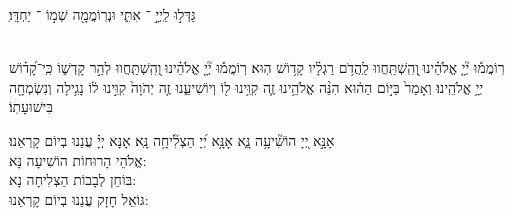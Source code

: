\documentclass[twoside, openany, parskip=half, 11pt]{book}
\begin{document}
ֽגַּדְּל֣וּ 
לַֽיְיָ֣ ־ אִתִּ֑י וּנְרֽוֹמֲמָ֖ה שְׁמ֣וֹ ־ יַחְדָּֽו׃

\\
רֽוֹמֲמ֡וּ
 יְ֘יָ֤ אֱלֹהֵ֗ינוּ ֖וְהִֽשְׁתַּֽחֲווּ לַֽהֲדֹ֥ם רַגְלָ֗יו קָד֥וֹשׁ הֽוּא׃ 
רֽוֹמֲמ֡וּ יְ֘יָ֤ אֱלֹהֵ֗ינוּ ֖וְהִֽשְׁתַּֽחֲווּ לְהַ֣ר קָדְשׁ֑וֹ כִּֽי־קָ֝ד֗וֹשׁ יְיָ֥ אֱלֹהֵֽינוּ׃
וְאָמַר֙
 בַּיּ֣וֹם הַה֔וּא הִנֵּ֨ה אֱלֹהֵ֥ינוּ זֶ֛ה קִוִּ֥ינוּ ל֖וֹ וְיוֹשִׁיעֵ֑נוּ זֶ֤ה יְהֹוָה֙ קִוִּ֣ינוּ ל֔וֹ נָגִ֥ילָה וְנִשְׂמְחָ֖ה בִּישׁוּעָתֽוֹ׃



אָנָּ֣א  יְ֭יָ הוֹשִׁ֘יעָ֥ה נָּ֑א אָנָּ֥א יְ֝יָ הַצְלִ֘יחָ֥ה נָּֽא׃ אָנָּא יְיָ֗ עֲנֵנוּ בְיוֹם קָרְאֵנוּ׃\\
 אֱלֹהֵי הָרוּחוֹת הוֹשִׁיעָה נָּא:\\ בּוֹחֵן לְבָבוֹת הַצְלִיחָה נָא:\\ גּוֹאֵל חָזָק עֲנֵנוּ בְיוֹם קָרְאֵנוּ:


\end{document}
